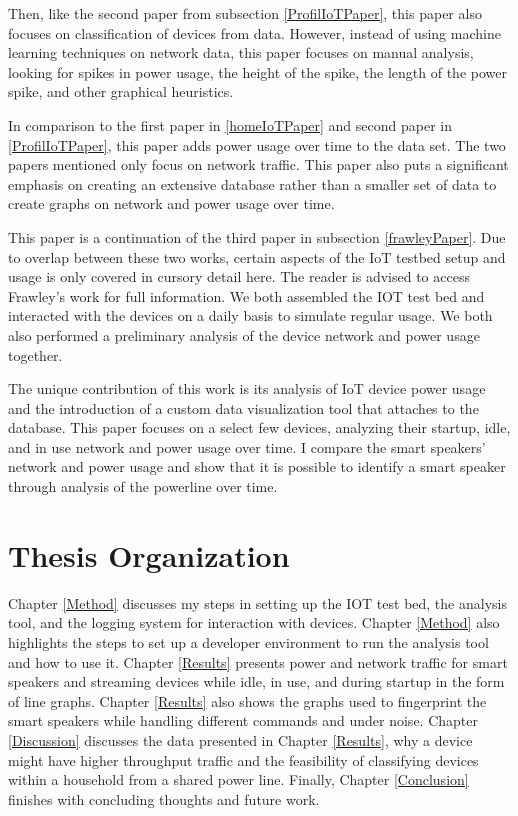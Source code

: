 Then, like the second paper from subsection \ref{ProfilIoTPaper}, this paper also focuses on classification of devices from data. However, instead of using machine learning techniques on network data, this paper focuses on manual analysis, looking for spikes in power usage, the height of the spike, the length of the power spike, and other graphical heuristics.

In comparison to the first paper in \ref{homeIoTPaper} and second paper in \ref{ProfilIoTPaper}, this paper adds power usage over time to the data set. The two papers mentioned only focus on network traffic. This paper also puts a significant emphasis on creating an extensive database rather than a smaller set of data to create graphs on network and power usage over time.

This paper is a continuation of the third paper in subsection \ref{frawleyPaper}. Due to overlap between these two works, certain aspects of the IoT testbed setup and usage is only covered in cursory detail here. The reader is advised to access Frawley's work for full information. We both assembled the IOT test bed and interacted with the devices on a daily basis to simulate regular usage. We both also performed a preliminary analysis of the device network and power usage together.

The unique contribution of this work is its analysis of IoT device power usage and the introduction of a custom data visualization tool that attaches to the database. This paper focuses on a select few devices, analyzing their startup, idle, and in use network and power usage over time. I compare the smart speakers' network and power usage and show that it is possible to identify a smart speaker through analysis of the powerline over time.

\section{Thesis Organization}
Chapter \ref{Method} discusses my steps in setting up the IOT test bed, the analysis tool, and the logging system for interaction with devices. Chapter \ref{Method} also highlights the steps to set up a developer environment to run the analysis tool and how to use it. Chapter \ref{Results} presents power and network traffic for smart speakers and streaming devices while idle, in use, and during startup in the form of line graphs. Chapter \ref{Results} also shows the graphs used to fingerprint the smart speakers while handling different commands and under noise. Chapter \ref{Discussion} discusses the data presented in Chapter \ref{Results}, why a device might have higher throughput traffic and the feasibility of classifying devices within a household from a shared power line. Finally, Chapter \ref{Conclusion} finishes with concluding thoughts and future work.
